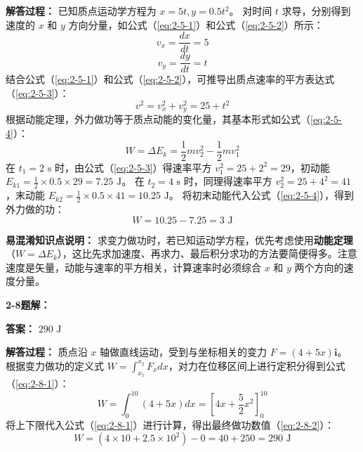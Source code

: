 \textbf{解答过程：}
已知质点运动学方程为 $x = 5t, y = 0.5t^2$。
对时间 $t$ 求导，分别得到速度的 $x$ 和 $y$ 方向分量，如公式（\ref{eq:2-5-1}）和公式（\ref{eq:2-5-2}）所示：
\begin{equation}\label{eq:2-5-1}
	v_x = \frac{dx}{dt} = 5
\end{equation}
\begin{equation}\label{eq:2-5-2}
	v_y = \frac{dy}{dt} = t
\end{equation}
结合公式（\ref{eq:2-5-1}）和公式（\ref{eq:2-5-2}），可推导出质点速率的平方表达式（\ref{eq:2-5-3}）：
\begin{equation}\label{eq:2-5-3}
	v^2 = v_x^2 + v_y^2 = 25 + t^2
\end{equation}
根据动能定理，外力做功等于质点动能的变化量，其基本形式如公式（\ref{eq:2-5-4}）：
\begin{equation}\label{eq:2-5-4}
	W = \Delta E_k = \frac{1}{2}mv_2^2 - \frac{1}{2}mv_1^2
\end{equation}
在 $t_1 = 2\text{ s}$ 时，由公式（\ref{eq:2-5-3}）得速率平方 $v_1^2 = 25 + 2^2 = 29$，初动能 $E_{k1} = \frac{1}{2} \times 0.5 \times 29 = 7.25\text{ J}$。
在 $t_2 = 4\text{ s}$ 时，同理得速率平方 $v_2^2 = 25 + 4^2 = 41$，末动能 $E_{k2} = \frac{1}{2} \times 0.5 \times 41 = 10.25\text{ J}$。
将初末动能代入公式（\ref{eq:2-5-4}），得到外力做的功：
$$W = 10.25 - 7.25 = 3\text{ J}$$

\textbf{易混淆知识点说明：}
求变力做功时，若已知运动学方程，优先考虑使用\textbf{动能定理}（$W = \Delta E_k$），这比先求加速度、再求力、最后积分求功的方法要简便得多。注意速度是矢量，动能与速率的平方相关，计算速率时必须综合 $x$ 和 $y$ 两个方向的速度分量。

\vspace{2em}

\textbf{2-8题解：}
\setcounter{equation}{0}
\renewcommand{\theHequation}{2-8.\arabic{equation}}

\textbf{答案：} $290\text{ J}$

\textbf{解答过程：}
质点沿 $x$ 轴做直线运动，受到与坐标相关的变力 $F = (4 + 5x)\mathbf{i}$。
根据变力做功的定义式 $W = \int_{x_1}^{x_2} F_x dx$，对力在位移区间上进行定积分得到公式（\ref{eq:2-8-1}）：
\begin{equation}\label{eq:2-8-1}
	W = \int_{0}^{10} (4 + 5x) dx = \left[ 4x + \frac{5}{2}x^2 \right]_{0}^{10}
\end{equation}
将上下限代入公式（\ref{eq:2-8-1}）进行计算，得出最终做功数值（\ref{eq:2-8-2}）：
\begin{equation}\label{eq:2-8-2}
	W = \left(4 \times 10 + 2.5 \times 10^2\right) - 0 = 40 + 250 = 290\text{ J}
\end{equation}

